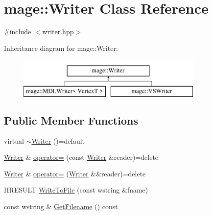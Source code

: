 \hypertarget{classmage_1_1_writer}{}\section{mage\+:\+:Writer Class Reference}
\label{classmage_1_1_writer}


{\ttfamily \#include $<$writer.\+hpp$>$}

Inheritance diagram for mage\+:\+:Writer\+:\begin{figure}[H]
\begin{center}
\leavevmode
\includegraphics[height=2.000000cm]{classmage_1_1_writer}
\end{center}
\end{figure}
\subsection*{Public Member Functions}
\begin{DoxyCompactItemize}
\item 
virtual \hyperlink{classmage_1_1_writer_a04fe27246806384099d518231c75c09f}{$\sim$\+Writer} ()=default
\item 
\hyperlink{classmage_1_1_writer}{Writer} \& \hyperlink{classmage_1_1_writer_a14fff6d050ad263bd351b26b86ca4186}{operator=} (const \hyperlink{classmage_1_1_writer}{Writer} \&reader)=delete
\item 
\hyperlink{classmage_1_1_writer}{Writer} \& \hyperlink{classmage_1_1_writer_aacbdb763abf79c5753b89bd336f56ea3}{operator=} (\hyperlink{classmage_1_1_writer}{Writer} \&\&reader)=delete
\item 
H\+R\+E\+S\+U\+LT \hyperlink{classmage_1_1_writer_ae9250f340229ee80dc5c518045567f7d}{Write\+To\+File} (const wstring \&fname)
\item 
const wstring \& \hyperlink{classmage_1_1_writer_aa874f2ee6cdd6663078d213f10d984f1}{Get\+Filename} () const
\end{DoxyCompactItemize}

